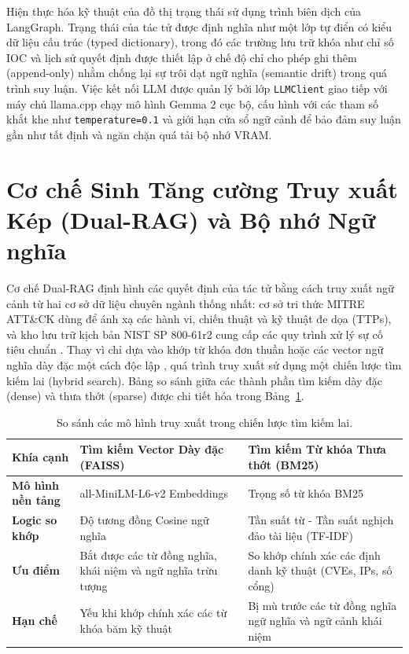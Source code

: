 Hiện thực hóa kỹ thuật của đồ thị trạng thái sử dụng trình biên dịch của LangGraph. Trạng thái của tác tử được định nghĩa như một lớp tự điển có kiểu dữ liệu cấu trúc (typed dictionary), trong đó các trường lưu trữ khóa như chỉ số IOC và lịch sử quyết định được thiết lập ở chế độ chỉ cho phép ghi thêm (append-only) nhằm chống lại sự trôi dạt ngữ nghĩa (semantic drift) trong quá trình suy luận. Việc kết nối LLM được quản lý bởi lớp \texttt{LLMClient} giao tiếp với máy chủ llama.cpp chạy mô hình Gemma 2 \cite{gemma_2_2024} cục bộ, cấu hình với các tham số khắt khe như \texttt{temperature=0.1} và giới hạn cửa sổ ngữ cảnh để bảo đảm suy luận gần như tất định và ngăn chặn quá tải bộ nhớ VRAM.

\section{Cơ chế Sinh Tăng cường Truy xuất Kép (Dual-RAG) và Bộ nhớ Ngữ nghĩa}

Cơ chế Dual-RAG định hình các quyết định của tác tử bằng cách truy xuất ngữ cảnh từ hai cơ sở dữ liệu chuyên ngành thống nhất: cơ sở tri thức MITRE ATT\&CK \cite{strom2018mitre} dùng để ánh xạ các hành vi, chiến thuật và kỹ thuật đe dọa (TTPs), và kho lưu trữ kịch bản NIST SP 800-61r2 cung cấp các quy trình xử lý sự cố tiêu chuẩn \cite{nist80061}. Thay vì chỉ dựa vào khớp từ khóa đơn thuần hoặc các vector ngữ nghĩa dày đặc một cách độc lập \cite{rag2020}, quá trình truy xuất sử dụng một chiến lược tìm kiếm lai (hybrid search). Bảng so sánh giữa các thành phần tìm kiếm dày đặc (dense) và thưa thớt (sparse) được chi tiết hóa trong Bảng~\ref{tab:search_comparison}.

\begin{table}[H]
    \centering
    \caption{So sánh các mô hình truy xuất trong chiến lược tìm kiếm lai.}
    \label{tab:search_comparison}
    \begin{tabular}{|>{\raggedright\arraybackslash}p{}|>{\raggedright\arraybackslash}p{}|>{\raggedright\arraybackslash}p{}|}
        \hline
        \textbf{Khía cạnh} & \textbf{Tìm kiếm Vector Dày đặc (FAISS)} & \textbf{Tìm kiếm Từ khóa Thưa thớt (BM25)} \\
        \hline
        \textbf{Mô hình nền tảng} & all-MiniLM-L6-v2 Embeddings \cite{reimers2019sentence} & Trọng số từ khóa BM25 \\
        \hline
        \textbf{Logic so khớp} & Độ tương đồng Cosine ngữ nghĩa \cite{faiss2019} & Tần suất từ - Tần suất nghịch đảo tài liệu (TF-IDF) \cite{bm25_2009} \\
        \hline
        \textbf{Ưu điểm} & Bắt được các từ đồng nghĩa, khái niệm và ngữ nghĩa trừu tượng & So khớp chính xác các định danh kỹ thuật (CVEs, IPs, số cổng) \\
        \hline
        \textbf{Hạn chế} & Yếu khi khớp chính xác các từ khóa băm kỹ thuật & Bị mù trước các từ đồng nghĩa ngữ nghĩa và ngữ cảnh khái niệm \\
        \hline
    \end{tabular}
\end{table}

